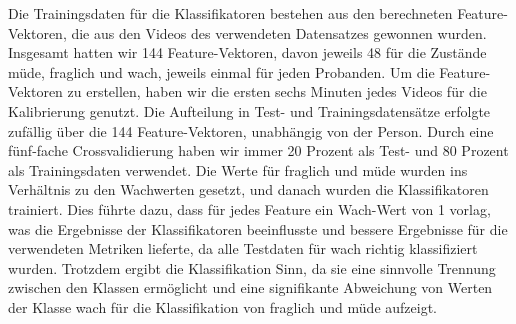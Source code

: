 Die Trainingsdaten für die Klassifikatoren bestehen aus den berechneten Feature-Vektoren, die aus den Videos des verwendeten Datensatzes gewonnen wurden. Insgesamt hatten wir 144 Feature-Vektoren, davon jeweils 48 für die Zustände \glqq müde\grqq{}, \glqq fraglich\grqq{} und \glqq wach\grqq{}, jeweils einmal für jeden Probanden. Um die Feature-Vektoren zu erstellen, haben wir die ersten sechs Minuten jedes Videos für die Kalibrierung genutzt. Die Aufteilung in Test- und Trainingsdatensätze erfolgte zufällig über die 144 Feature-Vektoren, unabhängig von der Person. Durch eine fünf-fache Crossvalidierung haben wir immer 20 Prozent als Test- und 80 Prozent als Trainingsdaten verwendet. Die Werte für \glqq fraglich\grqq{} und \glqq müde\grqq{} wurden ins Verhältnis zu den Wachwerten gesetzt, und danach wurden die Klassifikatoren trainiert. Dies führte dazu, dass für jedes Feature ein Wach-Wert von 1 vorlag, was die Ergebnisse der Klassifikatoren beeinflusste und bessere Ergebnisse für die verwendeten Metriken lieferte, da alle Testdaten für \glqq wach\grqq{} richtig klassifiziert wurden. Trotzdem ergibt die Klassifikation Sinn, da sie eine sinnvolle Trennung zwischen den Klassen ermöglicht und eine signifikante Abweichung von Werten der Klasse \glqq wach\grqq{} für die Klassifikation von \glqq fraglich\grqq{} und \glqq müde\grqq{} aufzeigt.

